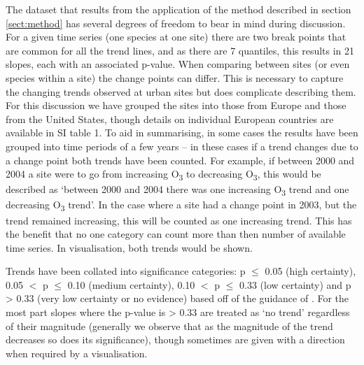 \documentclass[journal abbreviation, manuscript]{copernicus}
\begin{document}
The dataset that results from the application of the method described in section \ref{sect:method} has several degrees of freedom to bear in mind during discussion. For a given time series (one species at one site) there are two break points that are common for all the trend lines, and as there are 7 quantiles, this results in 21 slopes, each with an associated p-value. When comparing between sites (or even species within a site) the change points can differ. This is necessary to capture the changing trends observed at urban sites but does complicate describing them. For this discussion we have grouped the sites into those from Europe and those from the United States, though details on individual European countries are available in SI table 1. 
To aid in summarising, in some cases the results have been grouped into time periods of a few years – in these cases if a trend changes due to a change point both trends have been counted. For example, if between 2000 and 2004 a site were to go from increasing O\textsubscript{3} to decreasing O\textsubscript{3}, this would be described as ‘between 2000 and 2004 there was one increasing O\textsubscript{3} trend and one decreasing O\textsubscript{3} trend’. In the case where a site had a change point in 2003, but the trend remained increasing, this will be counted as one increasing trend. This has the benefit that no one category can count more than then number of available time series. In visualisation, both trends would be shown.

Trends have been collated into significance categories: p $\le$ 0.05 (high certainty), 0.05 $<$ p $\le$ 0.10 (medium certainty), 0.10 $<$ p $\le$ 0.33 (low certainty) and p > 0.33 (very low certainty or no evidence) based off of the guidance of \cite{chang2023guidancenotebeststatistical}. For the most part slopes where the p-value is > 0.33 are treated as ‘no trend’ regardless of their magnitude (generally we observe that as the magnitude of the trend decreases so does its significance), though sometimes are given with a direction when required by a visualisation.
\end{document}

